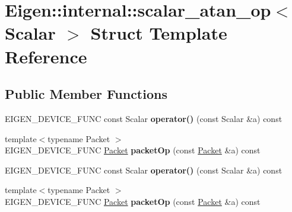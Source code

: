 \hypertarget{struct_eigen_1_1internal_1_1scalar__atan__op}{}\section{Eigen\+:\+:internal\+:\+:scalar\+\_\+atan\+\_\+op$<$ Scalar $>$ Struct Template Reference}
\label{struct_eigen_1_1internal_1_1scalar__atan__op}
\subsection*{Public Member Functions}
\begin{DoxyCompactItemize}
\item 
\mbox{\label{struct_eigen_1_1internal_1_1scalar__atan__op_a04ef6093fea73bc9fdb084deb43212dd}} 
E\+I\+G\+E\+N\+\_\+\+D\+E\+V\+I\+C\+E\+\_\+\+F\+U\+NC const Scalar {\bfseries operator()} (const Scalar \&a) const
\item 
\mbox{\label{struct_eigen_1_1internal_1_1scalar__atan__op_aa58f970745f7b563a6c9ce9f999ec008}} 
{\footnotesize template$<$typename Packet $>$ }\\E\+I\+G\+E\+N\+\_\+\+D\+E\+V\+I\+C\+E\+\_\+\+F\+U\+NC \hyperlink{union_eigen_1_1internal_1_1_packet}{Packet} {\bfseries packet\+Op} (const \hyperlink{union_eigen_1_1internal_1_1_packet}{Packet} \&a) const
\item 
\mbox{\label{struct_eigen_1_1internal_1_1scalar__atan__op_a04ef6093fea73bc9fdb084deb43212dd}} 
E\+I\+G\+E\+N\+\_\+\+D\+E\+V\+I\+C\+E\+\_\+\+F\+U\+NC const Scalar {\bfseries operator()} (const Scalar \&a) const
\item 
\mbox{\label{struct_eigen_1_1internal_1_1scalar__atan__op_aa58f970745f7b563a6c9ce9f999ec008}} 
{\footnotesize template$<$typename Packet $>$ }\\E\+I\+G\+E\+N\+\_\+\+D\+E\+V\+I\+C\+E\+\_\+\+F\+U\+NC \hyperlink{union_eigen_1_1internal_1_1_packet}{Packet} {\bfseries packet\+Op} (const \hyperlink{union_eigen_1_1internal_1_1_packet}{Packet} \&a) const
\end{DoxyCompactItemize}


